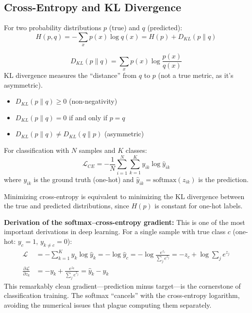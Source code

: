 \subsection{Cross-Entropy and KL Divergence}

\begin{definition}
For two probability distributions $p$ (true) and $q$ (predicted):
\begin{equation}
H(p, q) = -\sum_{x} p(x) \log q(x) = H(p) + D_{KL}(p \| q)
\end{equation}
\end{definition}

\begin{definition}[KL Divergence]
\begin{equation}
D_{KL}(p \| q) = \sum_{x} p(x) \log \frac{p(x)}{q(x)}
\end{equation}
KL divergence measures the ``distance'' from $q$ to $p$ (not a true metric, as it's asymmetric).
\end{definition}

\begin{property}
\begin{itemize}
    \item $D_{KL}(p \| q) \geq 0$ (non-negativity)
    \item $D_{KL}(p \| q) = 0$ if and only if $p = q$
    \item $D_{KL}(p \| q) \neq D_{KL}(q \| p)$ (asymmetric)
\end{itemize}
\end{property}

\begin{example}
For classification with $N$ samples and $K$ classes:
\begin{equation}
\mathcal{L}_{CE} = -\frac{1}{N}\sum_{i=1}^{N}\sum_{k=1}^{K} y_{ik} \log \hat{y}_{ik}
\end{equation}
where $y_{ik}$ is the ground truth (one-hot) and $\hat{y}_{ik} = \text{softmax}(z_{ik})$ is the prediction.

Minimizing cross-entropy is equivalent to minimizing the KL divergence between the true and predicted distributions, since $H(p)$ is constant for one-hot labels.

\textbf{Derivation of the softmax--cross-entropy gradient:} This is one of the most important derivations in deep learning. For a single sample with true class $c$ (one-hot: $y_c = 1$, $y_{k \neq c} = 0$):
\begin{align}
\mathcal{L} &= -\sum_{k=1}^{K} y_k \log \hat{y}_k = -\log \hat{y}_c = -\log \frac{e^{z_c}}{\sum_j e^{z_j}} = -z_c + \log \sum_j e^{z_j} \\
\frac{\partial \mathcal{L}}{\partial z_k} &= -y_k + \frac{e^{z_k}}{\sum_j e^{z_j}} = \hat{y}_k - y_k
\end{align}
This remarkably clean gradient---prediction minus target---is the cornerstone of classification training. The softmax ``cancels'' with the cross-entropy logarithm, avoiding the numerical issues that plague computing them separately.
\end{example}

